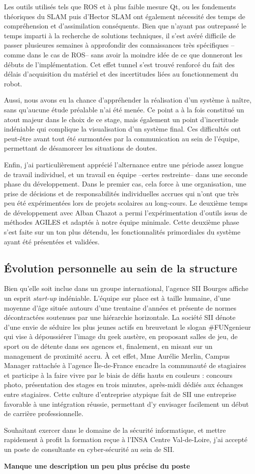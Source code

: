   Les outils utilisés tels que ROS et à plus faible mesure Qt, ou les fondements théoriques du SLAM puis d'Hector SLAM ont également nécessité des temps de compréhension et d'assimilation conséquents. 
  Bien que n'ayant pas outrepassé le temps imparti à la recherche de solutions techniques, il s'est avéré difficile de passer plusieures semaines à approfondir des connaissances très spécifiques --comme dans le cas de ROS-- sans 
  avoir la moindre idée de ce que donneront les débuts de l'implémentation. 
  Cet effet tunnel s'est trouvé renforcé du fait des délais d'acquisition du matériel et des incertitudes liées au fonctionnement du robot. 
  
  Aussi, nous avons eu la chance d'appréhender la réalisation d'un système à naître, sans qu'aucune étude préalable n'ai été menée. 
  Ce point a à la fois constitué un atout majeur dans le choix de ce stage, mais également un point d'incertitude indéniable qui complique la visualisation d'un système final. 
  Ces difficultés ont peut-être avant tout été surmontées par la communication au sein de l'équipe, permettant de désamorcer les situations de doutes. 
  
  Enfin, j'ai particulièrement apprécié l'alternance entre une période assez longue de travail individuel, et un travail en équipe --certes restreinte-- dans une seconde phase du développement. 
  Dans le premier cas, cela force à une organisation, une prise de décisions et de responsabilités individuelles accrues qui n'ont que très peu été expérimentées lors de projets scolaires au long-cours.
  Le deuxième temps de développement avec Alban Chazot a permi l'expérimentation d'outils issus de méthodes AGILES et adaptés à notre équipe minimale.  
  Cette deuxième phase s'est faite sur un ton plus détendu, les fonctionnalités primordiales du système ayant été présentées et validées. 
  
  \subsection{\'{E}volution personnelle au sein de la structure}
  
  Bien qu'elle soit inclue dans un groupe international, l'agence SII Bourges affiche un esprit \emph{start-up} indéniable. 
  L'équipe sur place est à taille humaine, d'une moyenne d'âge située autours d'une trentaine d'années et présente de normes décontractées soutenues par une hiérarchie horizontale.
  La société SII dénote d'une envie de séduire les plus jeunes actifs en breuvetant le slogan \#FUNgenieur qui vise à dépoussiérer l'image du geek austère, en proposant salles de jeu, de sport ou de détente dans ses agences et, 
  finalement, en misant sur un management de proximité accru.
  \`{A} cet effet, Mme Aurélie Merlin, Campus Manager rattachée à l'agence Île-de-France encadre la communauté de stagiaires et participe à la faire vivre par le biais de défis hauts en couleurs : concours photo, présentation 
  des stages en trois minutes, après-midi dédiés aux échanges entre stagiaires. 
  Cette culture d'entreprise atypique fait de SII une entreprise favorable à une intégration réussie, permettant d'y envisager facilement un début de carrière professionnelle. 
  
  Souhaitant exercer dans le domaine de la sécurité informatique, et mettre rapidement à profit la formation reçue à l'INSA Centre Val-de-Loire, j'ai accepté un poste de consultante en cyber-sécurité au sein de SII.
  
  \textbf{Manque une description un peu plus précise du poste}